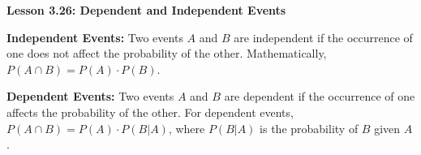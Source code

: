 \begin{center}
\textbf{Lesson 3.26: Dependent and Independent Events}
\end{center}

\vspace*{-1.5ex}

\noindent \textbf{Independent Events:} Two events \( A \) and \( B \) are independent if the occurrence of one does not affect the probability of the other. Mathematically, \( P(A \cap B) = P(A) \cdot P(B) \).

\noindent \textbf{Dependent Events:} Two events \( A \) and \( B \) are dependent if the occurrence of one affects the probability of the other. For dependent events, \( P(A \cap B) = P(A) \cdot P(B|A) \), where \( P(B|A) \) is the probability of \( B \) given \( A \).


